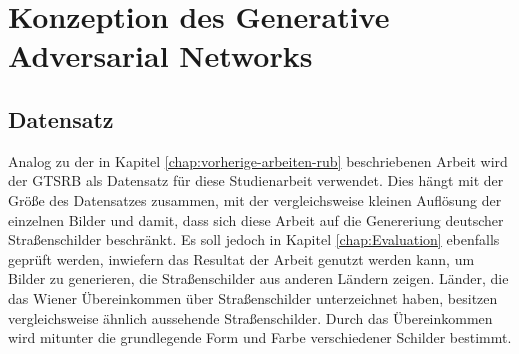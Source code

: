 \chapter{Konzeption des Generative Adversarial Networks}
\label{chap:konzept}
\section{Datensatz}
Analog zu der in Kapitel \ref{chap:vorherige-arbeiten-rub} beschriebenen Arbeit wird der \ac{GTSRB} als Datensatz für diese Studienarbeit verwendet. Dies hängt mit der Größe des Datensatzes zusammen, mit der vergleichsweise kleinen Auflösung der einzelnen Bilder und damit, dass sich diese Arbeit auf die Genereriung deutscher Straßenschilder beschränkt. Es soll jedoch in Kapitel \ref{chap:Evaluation} ebenfalls geprüft werden, inwiefern das Resultat der Arbeit genutzt werden kann, um Bilder zu generieren, die Straßenschilder aus anderen Ländern zeigen. Länder, die das Wiener Übereinkommen über Straßenschilder unterzeichnet haben, besitzen vergleichsweise ähnlich aussehende Straßenschilder. Durch das Übereinkommen wird mitunter die grundlegende Form und Farbe verschiedener Schilder bestimmt. \cite{vienna-convention} \cite{GTSRB}

